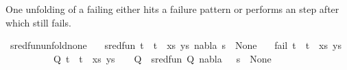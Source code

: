 %
\begin{isabellebody}%
%
%
\isadelimtheory
%
\endisadelimtheory
%
\isatagtheory
%
\endisatagtheory
{\isafoldtheory}%
%
\isadelimtheory
%
\endisadelimtheory
%
\isadelimdocument
%
\endisadelimdocument
%
\isatagdocument
%
\isamarkuptrue%
%
\endisatagdocument
{\isafolddocument}%
%
\isadelimdocument
%
\endisadelimdocument
%
\begin{isamarkuptext}%
One unfolding of a failing  either hits a failure pattern or performs an  step
after which  still fails.%
\end{isamarkuptext}\isamarkuptrue%
\isamarkupfalse%
\ sred{\isacharunderscore}{\kern0pt}fun{\isacharunderscore}{\kern0pt}unfold{\isacharunderscore}{\kern0pt}none{\isacharcolon}{\kern0pt}\isanewline
\ \ \ {\isachardoublequoteopen}sred{\isacharunderscore}{\kern0pt}fun\ {\isacharparenleft}{\kern0pt}{\isacharparenleft}{\kern0pt}{\isacharparenleft}{\kern0pt}t{}\ {\isasymapprox}{\isacharquery}{\kern0pt}\ t{}{\isacharparenright}{\kern0pt}\ {\isacharhash}{\kern0pt}\ xs{\isacharcomma}{\kern0pt}\ ys{\isacharparenright}{\kern0pt}{\isacharcomma}{\kern0pt}\ nabla{\isacharcomma}{\kern0pt}\ s{\isacharparenright}{\kern0pt}\ {\isacharequal}{\kern0pt}\ None{\isachardoublequoteclose}\isanewline
\ \ \ {\isachardoublequoteopen}fail\ {\isacharparenleft}{\kern0pt}{\isacharparenleft}{\kern0pt}t{}\ {\isasymapprox}{\isacharquery}{\kern0pt}\ t{}{\isacharparenright}{\kern0pt}\ {\isacharhash}{\kern0pt}\ xs{\isacharcomma}{\kern0pt}\ ys{\isacharparenright}{\kern0pt}\ {\isasymor}\ \isanewline
\ \ \ \ \ \ \ \ \ {\isacharparenleft}{\kern0pt}{\isasymexists}{\isasymsigma}\ Q{\isachardot}{\kern0pt}\ {\isacharparenleft}{\kern0pt}{\isacharparenleft}{\kern0pt}t{}\ {\isasymapprox}{\isacharquery}{\kern0pt}\ t{}{\isacharparenright}{\kern0pt}\ {\isacharhash}{\kern0pt}\ xs{\isacharcomma}{\kern0pt}\ ys{\isacharparenright}{\kern0pt}\ {\isasymturnstile}\ {\isasymsigma}\ {\isasymleadsto}\ Q\ {\isasymand}\ sred{\isacharunderscore}{\kern0pt}fun\ {\isacharparenleft}{\kern0pt}Q{\isacharcomma}{\kern0pt}\ nabla{\isacharcomma}{\kern0pt}\ {\isasymsigma}\ {\isasymbullet}\ s{\isacharparenright}{\kern0pt}\ {\isacharequal}{\kern0pt}\ None{\isacharparenright}{\kern0pt}{\isachardoublequoteclose}\isanewline

\end{isabellebody}
